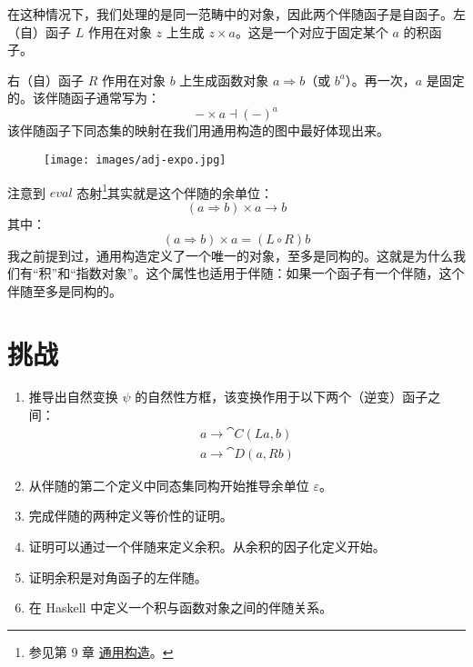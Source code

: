 在这种情况下，我们处理的是同一范畴中的对象，因此两个伴随函子是自函子。左（自）函子 $L$ 作用在对象 $z$ 上生成 $z\times{}a$。这是一个对应于固定某个 $a$ 的积函子。

右（自）函子 $R$ 作用在对象 $b$ 上生成函数对象 $a \Rightarrow b$（或 $b^a$）。再一次，$a$ 是固定的。该伴随函子通常写为：
\[-\times{}a \dashv (-)^a\]
该伴随函子下同态集的映射在我们用通用构造的图中最好体现出来。

\begin{figure}[H]
  \centering
  \texttt{[image: images/adj-expo.jpg]}
\end{figure}

\noindent
注意到 $\mathit{eval}$ 态射\footnote{参见第 9 章 \hyperref[function-types]{通用构造}。}其实就是这个伴随的余单位：
\[(a \Rightarrow b)\times{}a \to b\]
其中：
\[(a \Rightarrow b)\times{}a = (L \circ R) b\]
我之前提到过，通用构造定义了一个唯一的对象，至多是同构的。这就是为什么我们有“积”和“指数对象”。这个属性也适用于伴随：如果一个函子有一个伴随，这个伴随至多是同构的。

\section{挑战}

\begin{enumerate}
  \tightlist
  \item
  推导出自然变换 $\psi$ 的自然性方框，该变换作用于以下两个（逆变）函子之间：
  \begin{gather*}
    a \to \cat{C}(L a, b) \\
    a \to \cat{D}(a, R b)
  \end{gather*}
  \item
  从伴随的第二个定义中同态集同构开始推导余单位 $\varepsilon$。
  \item
  完成伴随的两种定义等价性的证明。
  \item
  证明可以通过一个伴随来定义余积。从余积的因子化定义开始。
  \item
  证明余积是对角函子的左伴随。
  \item
  在 Haskell 中定义一个积与函数对象之间的伴随关系。
\end{enumerate}
